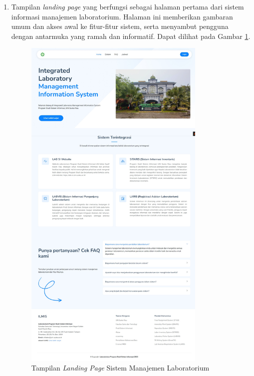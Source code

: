 \begin{enumerate}
	\item Tampilan \textit{landing page} yang berfungsi sebagai halaman pertama dari sistem informasi manajemen laboratorium. Halaman ini memberikan gambaran umum dan akses awal ke fitur-fitur sistem, serta menyambut pengguna dengan antarmuka yang ramah dan informatif. Dapat dilihat pada Gambar \ref{fig:landing-page}.
	      \begin{figure}
		      \centering
		      \includegraphics[width=0.82\textwidth]{konten/gambar/hasil/landing-page.jpeg}
		      \caption{Tampilan \textit{Landing Page} Sistem Manajemen Laboratorium}
		      \label{fig:landing-page}
	      \end{figure}

\end{enumerate}
